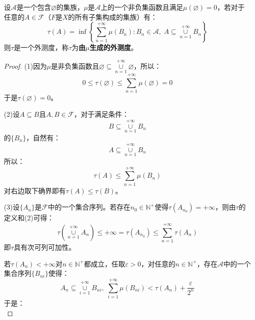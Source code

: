 \begin{theorem}
	设$\mathscr{A}$是一个包含$\varnothing$的集族，$\mu$是$\mathscr{A}$上的一个非负集函数且满足$\mu(\varnothing)=0$，若对于任意的$A\in\mathscr{F}$（$F$是$X$的所有子集构成的集族）有：
	\begin{equation*}
		\tau(A)=\inf\left\{\sum_{n=1}^{+\infty}\mu(B_n):B_n\in\mathscr{A},\;A\subseteq\underset{n=1}{\overset{+\infty}{\cup}}B_n\right\}
	\end{equation*}
	则$\tau$是一个外测度，称$\tau$为\textbf{由$\mu$生成的外测度}。
\end{theorem}
\begin{proof}
	(1)因为$\mu$是非负集函数且$\varnothing\subseteq\underset{n=1}{\overset{+\infty}{\cup}}\varnothing$，所以：
	\begin{equation*}
		0\leqslant\tau(\varnothing)\leqslant\sum_{n=1}^{+\infty}\mu(\varnothing)=0
	\end{equation*}
	于是$\tau(\varnothing)=0$。\par
	(2)设$A\subseteq B$且$A,B\in\mathscr{F}$，对于满足条件：
	\begin{equation*}
		B\subseteq\underset{n=1}{\overset{+\infty}{\cup}}B_n
	\end{equation*}
	的$\{B_n\}$，自然有：
	\begin{equation*}
		A\subseteq\underset{n=1}{\overset{+\infty}{\cup}}B_n
	\end{equation*}
	所以：
	\begin{equation*}
		\tau(A)\leqslant\sum_{n=1}^{+\infty}\mu(B_n)
	\end{equation*}
	对右边取下确界即有$\tau(A)\leqslant\tau(B)$。\par
	(3)设$\{A_n\}$是$\mathscr{F}$中的一个集合序列。若存在$n_0\in\mathbb{N}^+$使得$\tau(A_{n_0})=+\infty$，则由$\tau$的定义和(2)可得：
	\begin{equation*}
		\tau\left(\underset{n=1}{\overset{+\infty}{\cup}}A_n\right)\leqslant+\infty=\tau(A_{n_0})\leqslant\sum_{n=1}^{+\infty}\tau(A_n)
	\end{equation*}
	即$\tau$具有次可列可加性。\par
	若$\tau(A_n)<+\infty$对$n\in\mathbb{N}^+$都成立，任取$\varepsilon>0$，对任意的$n\in\mathbb{N}^+$，存在$\mathscr{A}$中的一个集合序列$\{B_{ni}\}$使得：
	\begin{equation*}
		A_n\subseteq\underset{i=1}{\overset{+\infty}{\cup}}B_{ni},\;
		\sum_{i=1}^{+\infty}\mu(B_{ni})<\tau(A_n)+\frac{\varepsilon}{2^n}
	\end{equation*}
	于是：
	\begin{equation*}

\end{equation*}
\end{proof}
